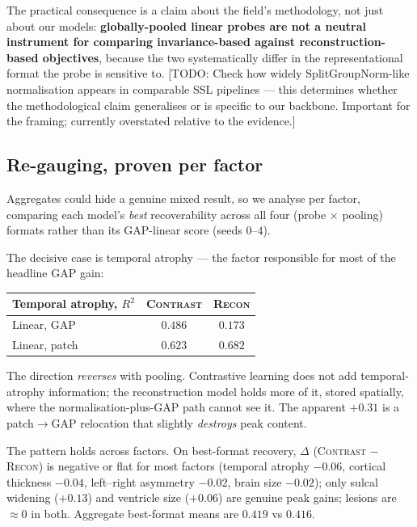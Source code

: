 \documentclass[11pt]{article}
\newcommand{\todo}[1]{{\color{blue}\small[TODO: #1]}}
\begin{document}
The practical consequence is a claim about the field's methodology, not just
about our models: \textbf{globally-pooled linear probes are not a neutral
instrument for comparing invariance-based against reconstruction-based
objectives}, because the two systematically differ in the representational
format the probe is sensitive to. \todo{Check how widely SplitGroupNorm-like
normalisation appears in comparable SSL pipelines --- this determines whether
the methodological claim generalises or is specific to our backbone. Important
for the framing; currently overstated relative to the evidence.}

\subsection{Re-gauging, proven per factor}

Aggregates could hide a genuine mixed result, so we analyse per factor,
comparing each model's \emph{best} recoverability across all four
(probe $\times$ pooling) formats rather than its GAP-linear score
(seeds $0$--$4$).

The decisive case is temporal atrophy --- the factor responsible for most of the
headline GAP gain:

\begin{center}
\begin{tabular}{lcc}
\toprule
Temporal atrophy, $R^2$ & \textsc{Contrast} & \textsc{Recon} \\
\midrule
Linear, GAP   & $\mathbf{0.486}$ & $0.173$ \\
Linear, patch & $0.623$ & $\mathbf{0.682}$ \\
\bottomrule
\end{tabular}
\end{center}

The direction \emph{reverses} with pooling. Contrastive learning does not add
temporal-atrophy information; the reconstruction model holds more of it, stored
spatially, where the normalisation-plus-GAP path cannot see it. The apparent
$+0.31$ is a patch$\to$GAP relocation that slightly \emph{destroys} peak
content.

The pattern holds across factors. On best-format recovery, $\Delta$
(\textsc{Contrast} $-$ \textsc{Recon}) is negative or flat for most factors
(temporal atrophy $-0.06$, cortical thickness $-0.04$, left--right asymmetry
$-0.02$, brain size $-0.02$); only sulcal widening ($+0.13$) and ventricle size
($+0.06$) are genuine peak gains; lesions are $\approx\!0$ in both. Aggregate
best-format means are $0.419$ vs $0.416$.
\end{document}
